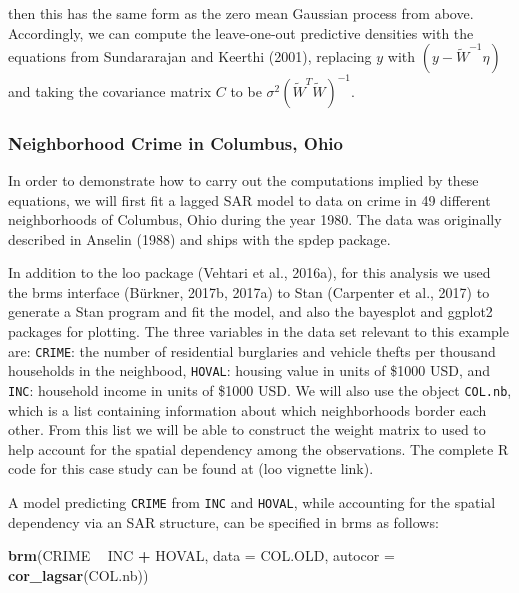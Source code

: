 \documentclass[english,,doc,floatsintext]{apa6}
\newenvironment{Shaded}{\begin{snugshade}}{\end{snugshade}}
\newcommand{\DataTypeTok}[1]{\textcolor[rgb]{0.13,0.29,0.53}{#1}}
\newcommand{\KeywordTok}[1]{\textcolor[rgb]{0.13,0.29,0.53}{\textbf{#1}}}
\newcommand{\NormalTok}[1]{#1}
\newcommand{\OperatorTok}[1]{\textcolor[rgb]{0.81,0.36,0.00}{\textbf{#1}}}
\newcommand{\StringTok}[1]{\textcolor[rgb]{0.31,0.60,0.02}{#1}}
\theoremstyle{definition}
\theoremstyle{definition}
\theoremstyle{definition}
\theoremstyle{remark}
\begin{document}
then this has the same form as the zero mean Gaussian process from
above. Accordingly, we can compute the leave-one-out predictive
densities with the equations from Sundararajan and Keerthi (2001),
replacing \(y\) with \((y-\widetilde{W}^{-1}\eta)\) and taking the
covariance matrix \(C\) to be
\(\sigma^2(\widetilde{W}^{T}\widetilde{W})^{-1}\).

\hypertarget{neighborhood-crime-in-columbus-ohio}{%
\subsubsection{Neighborhood Crime in Columbus,
Ohio}\label{neighborhood-crime-in-columbus-ohio}}

In order to demonstrate how to carry out the computations implied by
these equations, we will first fit a lagged SAR model to data on crime
in 49 different neighborhoods of Columbus, Ohio during the year 1980.
The data was originally described in Anselin (1988) and ships with the
spdep package.

In addition to the loo package (Vehtari et al., 2016a), for this
analysis we used the brms interface (Bürkner, 2017b, 2017a) to Stan
(Carpenter et al., 2017) to generate a Stan program and fit the model,
and also the bayesplot and ggplot2 packages for plotting. The three
variables in the data set relevant to this example are: \texttt{CRIME}:
the number of residential burglaries and vehicle thefts per thousand
households in the neighbood, \texttt{HOVAL}: housing value in units of
\$1000 USD, and \texttt{INC}: household income in units of \$1000 USD.
We will also use the object \texttt{COL.nb}, which is a list containing
information about which neighborhoods border each other. From this list
we will be able to construct the weight matrix to used to help account
for the spatial dependency among the observations. The complete R code
for this case study can be found at (loo vignette link).

A model predicting \texttt{CRIME} from \texttt{INC} and \texttt{HOVAL},
while accounting for the spatial dependency via an SAR structure, can be
specified in brms as follows:

\begin{Shaded}
\begin{Highlighting}[]
\KeywordTok{brm}\NormalTok{(CRIME }\OperatorTok{~}\StringTok{ }\NormalTok{INC }\OperatorTok{+}\StringTok{ }\NormalTok{HOVAL, }\DataTypeTok{data =}\NormalTok{ COL.OLD, }\DataTypeTok{autocor =} \KeywordTok{cor_lagsar}\NormalTok{(COL.nb))}
\end{Highlighting}
\end{Shaded}
\end{document}
